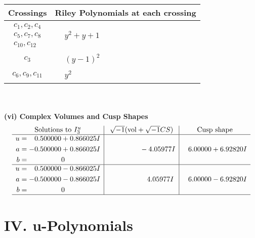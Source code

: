 \documentclass[1p]{elsarticle_modified}
\theoremstyle{definition}
\newcommand{\I}{\sqrt{-1}}
\begin{document}
\begin{tabular}{m{50pt}|m{274pt}}
Crossings & \hspace{64pt}Riley Polynomials at each crossing \\
\hline $$\begin{aligned}c_{1},c_{2},c_{4}\\c_{5},c_{7},c_{8}\\c_{10},c_{12}\end{aligned}$$&$\begin{aligned}
&y^2+y+1
\end{aligned}$\\
\hline $$\begin{aligned}c_{3}\end{aligned}$$&$\begin{aligned}
&(y-1)^2
\end{aligned}$\\
\hline $$\begin{aligned}c_{6},c_{9},c_{11}\end{aligned}$$&$\begin{aligned}
&y^2
\end{aligned}$\\
\hline
\end{tabular}\\~\\
\newpage\flushleft \textbf{(vi) Complex Volumes and Cusp Shapes}
$$\begin{array}{c|c|c}  
\text{Solutions to }I^u_{3}& \I (\text{vol} + \sqrt{-1}CS) & \text{Cusp shape}\\
 \hline 
\begin{aligned}
u &= \phantom{-}0.500000 + 0.866025 I \\
a &= -0.500000 + 0.866025 I \\
b &= \phantom{-0.000000 } 0\end{aligned}
 & \phantom{-0.000000 } -4.05977 I & \phantom{-}6.00000 + 6.92820 I \\ \hline\begin{aligned}
u &= \phantom{-}0.500000 - 0.866025 I \\
a &= -0.500000 - 0.866025 I \\
b &= \phantom{-0.000000 } 0\end{aligned}
 & \phantom{-0.000000 -}4.05977 I & \phantom{-}6.00000 - 6.92820 I\\
 \hline 
 \end{array}$$\newpage
\newpage\renewcommand{\arraystretch}{1}
\centering \section*{ IV. u-Polynomials}
\end{document}
